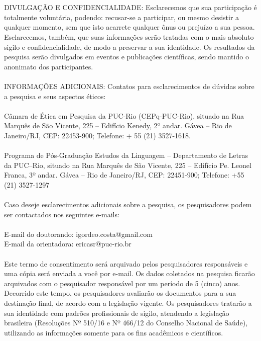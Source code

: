 \\
\\
DIVULGAÇÃO E CONFIDENCIALIDADE: Esclarecemos que sua participação é totalmente voluntária, podendo: recusar-se a participar, ou mesmo desistir a qualquer momento, sem que isto acarrete qualquer ônus ou prejuízo a sua pessoa. Esclarecemos, também, que suas informações serão tratadas com o mais absoluto sigilo e confidencialidade, de modo a preservar a sua identidade. Os resultados da pesquisa serão divulgados em eventos e publicações científicas, sendo mantido o anonimato dos participantes.
\\
\\
INFORMAÇÕES ADICIONAIS: Contatos para esclarecimentos de dúvidas sobre a pesquisa e seus aspectos éticos:
\\
\\
Câmara de Ética em Pesquisa da PUC-Rio (CEPq-PUC-Rio), situado  na Rua Marquês de São Vicente, 225 -- Edifício Kenedy, 2º andar. Gávea -- Rio de Janeiro/RJ, CEP: 22453-900; Telefone: + 55 (21) 3527-1618.
\\
\\
Programa de Pós-Graduação Estudos da Linguagem -- Departamento de Letras da PUC--Rio, situado na Rua Marquês de São Vicente, 225 -- Edifício Pe. Leonel Franca, 3º andar. Gávea -- Rio de Janeiro/RJ, CEP: 22451-900; Telefone: +55 (21) 3527-1297
\\
\\
Caso deseje esclarecimentos adicionais sobre a pesquisa, os pesquisadores podem ser contactados nos seguintes e-mails:
\\
\\
E-mail do doutorando: igordeo.costa@gmail.com \\
E-mail da orientadora: ericasr@puc-rio.br
\\
\\
Este termo de consentimento será arquivado pelos pesquisadores responsáveis e uma cópia será enviada a você por e-mail. Os dados coletados na pesquisa ficarão arquivados com o pesquisador responsável por um período de 5 (cinco) anos. Decorrido este tempo, os pesquisadores avaliarão os documentos para a sua destinação final, de acordo com a legislação vigente. Os pesquisadores tratarão a sua identidade com padrões profissionais de sigilo, atendendo a legislação brasileira (Resoluções Nº 510/16 e Nº 466/12 do Conselho Nacional de Saúde), utilizando as informações somente para os fins acadêmicos e científicos.
\\
\\
